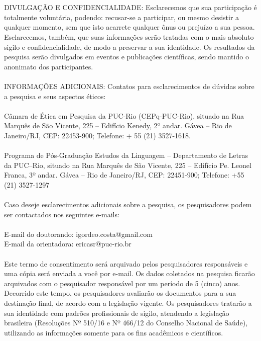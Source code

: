 \\
\\
DIVULGAÇÃO E CONFIDENCIALIDADE: Esclarecemos que sua participação é totalmente voluntária, podendo: recusar-se a participar, ou mesmo desistir a qualquer momento, sem que isto acarrete qualquer ônus ou prejuízo a sua pessoa. Esclarecemos, também, que suas informações serão tratadas com o mais absoluto sigilo e confidencialidade, de modo a preservar a sua identidade. Os resultados da pesquisa serão divulgados em eventos e publicações científicas, sendo mantido o anonimato dos participantes.
\\
\\
INFORMAÇÕES ADICIONAIS: Contatos para esclarecimentos de dúvidas sobre a pesquisa e seus aspectos éticos:
\\
\\
Câmara de Ética em Pesquisa da PUC-Rio (CEPq-PUC-Rio), situado  na Rua Marquês de São Vicente, 225 -- Edifício Kenedy, 2º andar. Gávea -- Rio de Janeiro/RJ, CEP: 22453-900; Telefone: + 55 (21) 3527-1618.
\\
\\
Programa de Pós-Graduação Estudos da Linguagem -- Departamento de Letras da PUC--Rio, situado na Rua Marquês de São Vicente, 225 -- Edifício Pe. Leonel Franca, 3º andar. Gávea -- Rio de Janeiro/RJ, CEP: 22451-900; Telefone: +55 (21) 3527-1297
\\
\\
Caso deseje esclarecimentos adicionais sobre a pesquisa, os pesquisadores podem ser contactados nos seguintes e-mails:
\\
\\
E-mail do doutorando: igordeo.costa@gmail.com \\
E-mail da orientadora: ericasr@puc-rio.br
\\
\\
Este termo de consentimento será arquivado pelos pesquisadores responsáveis e uma cópia será enviada a você por e-mail. Os dados coletados na pesquisa ficarão arquivados com o pesquisador responsável por um período de 5 (cinco) anos. Decorrido este tempo, os pesquisadores avaliarão os documentos para a sua destinação final, de acordo com a legislação vigente. Os pesquisadores tratarão a sua identidade com padrões profissionais de sigilo, atendendo a legislação brasileira (Resoluções Nº 510/16 e Nº 466/12 do Conselho Nacional de Saúde), utilizando as informações somente para os fins acadêmicos e científicos.
\\
\\
